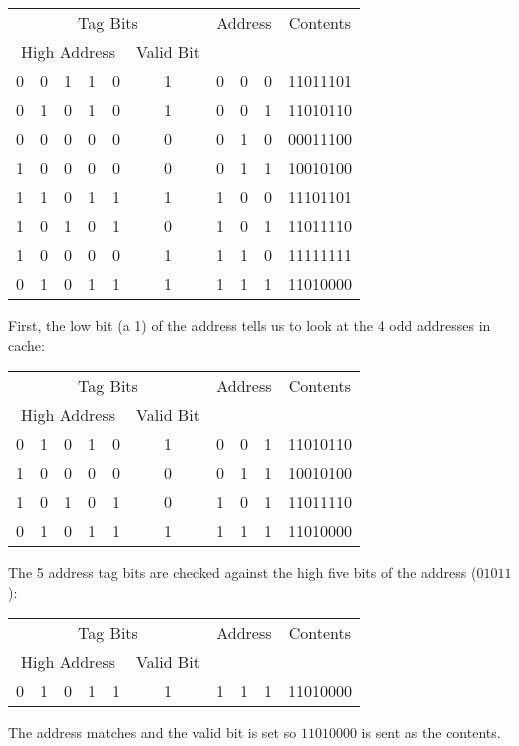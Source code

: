 {    \begin{tabular}{|ccccc|c|ccc|c|}
      \hline
      \multicolumn{6}{|c|}{Tag Bits} & \multicolumn{3}{|c|}{Address} & Contents \\
      \multicolumn{5}{|c|}{High Address} & Valid Bit & \multicolumn{3}{|c|}{} &  \\
      \hline
      0 & 0 & 1 & 1 & 0 & 1 & 0 & 0 & 0 & 11011101 \\
      0 & 1 & 0 & 1 & 0 & 1 & 0 & 0 & 1 & 11010110 \\
      0 & 0 & 0 & 0 & 0 & 0 & 0 & 1 & 0 & 00011100 \\
      1 & 0 & 0 & 0 & 0 & 0 & 0 & 1 & 1 & 10010100 \\
      1 & 1 & 0 & 1 & 1 & 1 & 1 & 0 & 0 & 11101101 \\
      1 & 0 & 1 & 0 & 1 & 0 & 1 & 0 & 1 & 11011110 \\
      1 & 0 & 0 & 0 & 0 & 1 & 1 & 1 & 0 & 11111111 \\
      0 & 1 & 0 & 1 & 1 & 1 & 1 & 1 & 1 & 11010000 \\
      \hline
    \end{tabular}

    First, the low bit (a 1) of the address tells us to look at the 4 odd addresses in cache:

    \begin{tabular}{|ccccc|c|ccc|c|}
      \hline
      \multicolumn{6}{|c|}{Tag Bits} & \multicolumn{3}{|c|}{Address} & Contents \\
      \multicolumn{5}{|c|}{High Address} & Valid Bit & \multicolumn{3}{|c|}{} &  \\
      \hline
      0 & 1 & 0 & 1 & 0 & 1 & 0 & 0 & 1 & 11010110 \\
      1 & 0 & 0 & 0 & 0 & 0 & 0 & 1 & 1 & 10010100 \\
      1 & 0 & 1 & 0 & 1 & 0 & 1 & 0 & 1 & 11011110 \\
      0 & 1 & 0 & 1 & 1 & 1 & 1 & 1 & 1 & 11010000 \\
      \hline
    \end{tabular}

    The 5 address tag bits are checked against the high five bits of the address ($01011$):

    \begin{tabular}{|ccccc|c|ccc|c|}
      \hline
      \multicolumn{6}{|c|}{Tag Bits} & \multicolumn{3}{|c|}{Address} & Contents \\
      \multicolumn{5}{|c|}{High Address} & Valid Bit & \multicolumn{3}{|c|}{} &  \\
      \hline
      0 & 1 & 0 & 1 & 1 & 1 & 1 & 1 & 1 & 11010000 \\
      \hline
    \end{tabular}

    The address matches and the valid bit is set so $11010000$ is sent as the contents.

    }


